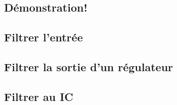 \subsection{Démonstration!}

\subsection{Filtrer l'entrée}
\subsection{Filtrer la sortie d'un régulateur}
\subsection{Filtrer au IC}